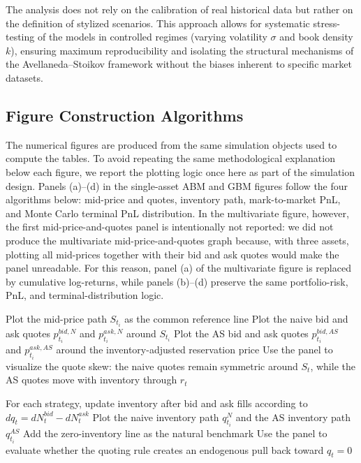 The analysis does not rely on the calibration of real historical data but rather on the definition of stylized scenarios. This approach allows for systematic stress-testing of the models in controlled regimes (varying volatility $\sigma$ and book density $k$), ensuring maximum reproducibility and isolating the structural mechanisms of the Avellaneda--Stoikov framework without the biases inherent to specific market datasets.





\subsection{Figure Construction Algorithms}
The numerical figures are produced from the same simulation objects used to compute the tables. To avoid repeating the same methodological explanation below each figure, we report the plotting logic once here as part of the simulation design. Panels (a)--(d) in the single-asset ABM and GBM figures follow the four algorithms below: mid-price and quotes, inventory path, mark-to-market PnL, and Monte Carlo terminal PnL distribution. In the multivariate figure, however, the first mid-price-and-quotes panel is intentionally not reported: we did not produce the multivariate mid-price-and-quotes graph because, with three assets, plotting all mid-prices together with their bid and ask quotes would make the panel unreadable. For this reason, panel (a) of the multivariate figure is replaced by cumulative log-returns, while panels (b)--(d) preserve the same portfolio-risk, PnL, and terminal-distribution logic.

\begin{algorithm}[H]
\caption{Panel (a): Mid-price and quotes}
\DontPrintSemicolon
{}
Plot the mid-price path $S_{t_i}$ as the common reference line\;
Plot the naive bid and ask quotes $p_{t_i}^{bid,N}$ and $p_{t_i}^{ask,N}$ around $S_{t_i}$\;
Plot the AS bid and ask quotes $p_{t_i}^{bid,AS}$ and $p_{t_i}^{ask,AS}$ around the inventory-adjusted reservation price\;
Use the panel to visualize the quote skew: the naive quotes remain symmetric around $S_t$, while the AS quotes move with inventory through $r_t$\;
\end{algorithm}

\begin{algorithm}[H]
\caption{Panel (b): Inventory path}
\DontPrintSemicolon
{}
For each strategy, update inventory after bid and ask fills according to $dq_t=dN_t^{bid}-dN_t^{ask}$\;
Plot the naive inventory path $q_{t_i}^{N}$ and the AS inventory path $q_{t_i}^{AS}$\;
Add the zero-inventory line as the natural benchmark\;
Use the panel to evaluate whether the quoting rule creates an endogenous pull back toward $q_t=0$\;
\end{algorithm}

